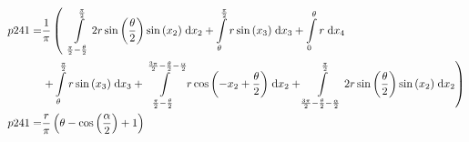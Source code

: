 \begin{align}
    p241 =&\frac{1}{\pi} \left(\;\;\int\limits_{\frac{\pi}{2} - \frac{\theta}{2}}^{\frac{\pi}{2}}2 r \sin{\left (\frac{\theta}{2} \right )} \sin{\left (x_{2} \right )}\;\mathrm{d}x_{2}+\int\limits_{\theta}^{\frac{\pi}{2}}r \sin{\left (x_{3} \right )}\;\mathrm{d}x_{3}+\int\limits_{0}^{\theta}r\;\mathrm{d}x_{4}\right.\notag\\
 &\left.+\int\limits_{\theta}^{\frac{\pi}{2}}r \sin{\left (x_{3} \right )}\;\mathrm{d}x_{3}+\int\limits_{\frac{\pi}{2} - \frac{\theta}{2}}^{\frac{3 \pi}{2} - \frac{\theta}{2} - \frac{\alpha}{2}}r \cos{\left (- x_{2} + \frac{\theta}{2} \right )}\;\mathrm{d}x_{2}+\int\limits_{\frac{3 \pi}{2} - \frac{\theta}{2} - \frac{\alpha}{2}}^{\frac{\pi}{2}}2 r \sin{\left (\frac{\theta}{2} \right )} \sin{\left (x_{2} \right )}\;\mathrm{d}x_{2}\right)\label{p241Def}\\
    p241 =& \frac{r}{\pi} \left(\theta - \cos{\left (\frac{\alpha}{2} \right )} + 1\right)\label{p241Sln}
\end{align}